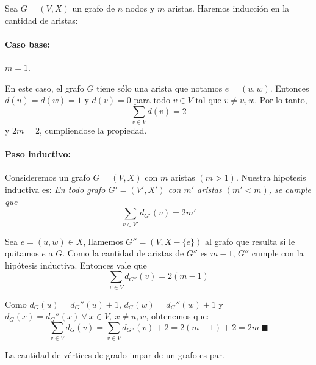 \begin{demo}
Sea \(G = (V, X)\) un grafo de \(n\) nodos y \(m\) aristas. Haremos inducción en la cantidad de aristas:

\paragraph{Caso base:} \(m = 1\).

	En este caso, el grafo \(G\) tiene sólo una arista que notamos \(e = (u,w)\). Entonces \(d(u) = d(w) = 1\) y \(d(v) = 0\) para todo \(v\in V\) tal que \(v\neq u,w\). Por lo tanto, \[\sum_{v\in V}d(v) = 2\] y \(2m = 2\), cumpliendose la propiedad.
\paragraph{Paso inductivo:} Consideremos un grafo \(G=(V,X)\) con \(m\) aristas \((m > 1)\). Nuestra hipotesis inductiva es: \textit{En todo grafo \(G' = (V', X')\) con \(m'\) aristas \((m' < m)\), se cumple que } \[\sum_{v\in V'}{d_{G'}}(v) = 2m'\]

Sea \(e = (u,w) \in X\), llamemos \(G'' = (V, X-\{e\})\) al grafo que resulta si le quitamos \(e\) a \(G\). Como la cantidad de aristas de \(G''\) es \(m-1\), \(G''\) cumple con la hipótesis inductiva. Entonces vale que 
 \[\sum_{v\in V}{d_{G''}}(v) = 2(m-1)\]
 
Como \(d_G(u) = d_G''(u) + 1\), \(d_G(w) = d_G''(w) + 1\) y \(d_G(x) = d_G''(x)~\forall~x\in V,~x\neq u,w\), obtenemos que: \[\sum_{v\in V}{d_{G}}(v) = \sum_{v\in V}{d_{G''}}(v) + 2 = 2(m-1) + 2 = 2m~\blacksquare\]
\end{demo}

\begin{coro}
La cantidad de vértices de grado impar de un grafo es par.
\end{coro}


